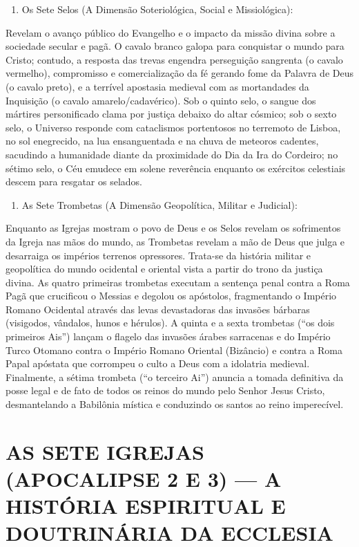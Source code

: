 \documentclass[11pt,a4paper,openany]{book}
\begin{document}
\begin{enumerate}
  \item Os Sete Selos (A Dimensão Soteriológica, Social e Missiológica):
\end{enumerate}

Revelam o avanço público do Evangelho e o impacto da missão divina sobre a sociedade secular e pagã. O cavalo branco galopa para conquistar o mundo para Cristo; contudo, a resposta das trevas engendra perseguição sangrenta (o cavalo vermelho), compromisso e comercialização da fé gerando fome da Palavra de Deus (o cavalo preto), e a terrível apostasia medieval com as mortandades da Inquisição (o cavalo amarelo/cadavérico). Sob o quinto selo, o sangue dos mártires personificado clama por justiça debaixo do altar cósmico; sob o sexto selo, o Universo responde com cataclismos portentosos no terremoto de Lisboa, no sol enegrecido, na lua ensanguentada e na chuva de meteoros cadentes, sacudindo a humanidade diante da proximidade do Dia da Ira do Cordeiro; no sétimo selo, o Céu emudece em solene reverência enquanto os exércitos celestiais descem para resgatar os selados.

\begin{enumerate}
  \item As Sete Trombetas (A Dimensão Geopolítica, Militar e Judicial):
\end{enumerate}

Enquanto as Igrejas mostram o povo de Deus e os Selos revelam os sofrimentos da Igreja nas mãos do mundo, as Trombetas revelam a mão de Deus que julga e desarraiga os impérios terrenos opressores. Trata-se da história militar e geopolítica do mundo ocidental e oriental vista a partir do trono da justiça divina. As quatro primeiras trombetas executam a sentença penal contra a Roma Pagã que crucificou o Messias e degolou os apóstolos, fragmentando o Império Romano Ocidental através das levas devastadoras das invasões bárbaras (visigodos, vândalos, hunos e hérulos). A quinta e a sexta trombetas (``os dois primeiros Ais'') lançam o flagelo das invasões árabes sarracenas e do Império Turco Otomano contra o Império Romano Oriental (Bizâncio) e contra a Roma Papal apóstata que corrompeu o culto a Deus com a idolatria medieval. Finalmente, a sétima trombeta (``o terceiro Ai'') anuncia a tomada definitiva da posse legal e de fato de todos os reinos do mundo pelo Senhor Jesus Cristo, desmantelando a Babilônia mística e conduzindo os santos ao reino imperecível.


\section{AS SETE IGREJAS (APOCALIPSE 2 E 3) — A HISTÓRIA ESPIRITUAL E DOUTRINÁRIA DA ECCLESIA}
\end{document}
